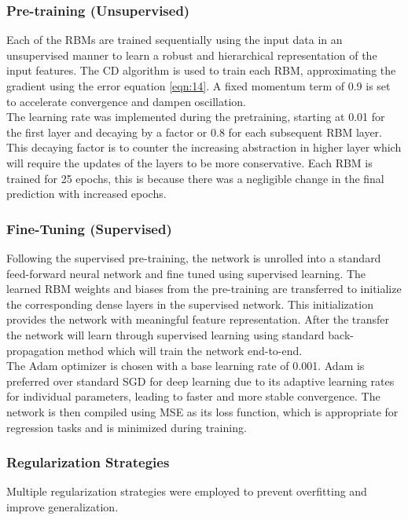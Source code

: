  \subsubsection{Pre-training (Unsupervised)}Each of the RBMs are trained sequentially using the input data in an unsupervised manner to learn a robust and hierarchical representation of the input features. The CD algorithm is used to train each RBM, approximating the gradient using the error equation \ref{eqn:14}. A fixed momentum term of 0.9 is set to accelerate convergence and dampen oscillation.\\ The learning rate was implemented during the pretraining, starting at 0.01 for the first layer and decaying by a factor or 0.8 for each subsequent RBM layer. This decaying factor is to counter the increasing abstraction in higher layer which will require the updates of the layers to be more conservative. Each RBM is trained for 25 epochs, this is because there was a negligible change in the final prediction with increased epochs.
 
 \subsubsection{Fine-Tuning (Supervised)} Following the supervised pre-training, the network is unrolled into a standard feed-forward neural network and fine tuned using supervised learning. The learned RBM weights and biases from the pre-training are transferred to initialize the corresponding dense layers in the supervised network. This initialization provides the network with meaningful feature representation. After the transfer the network will learn through supervised learning using standard back-propagation method which will train the network end-to-end.
 \\
 The Adam optimizer is chosen with a base learning rate of 0.001. Adam is preferred over standard SGD for deep learning due to its adaptive learning rates for individual parameters, leading to faster and more stable convergence. The network is then compiled using MSE as its loss function, which is appropriate for regression tasks and is minimized during training.
 
 \subsubsection{Regularization Strategies}
 Multiple regularization strategies were employed to prevent overfitting and improve generalization.
 
